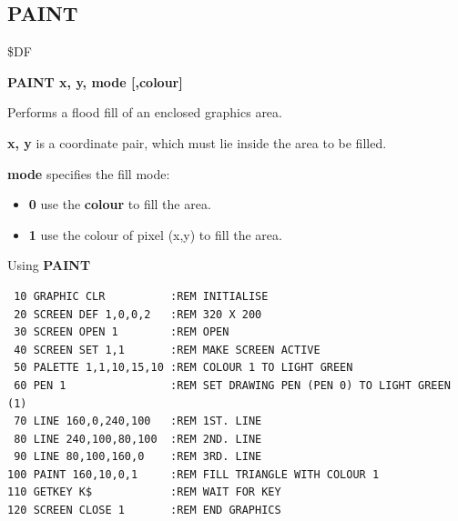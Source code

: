 
\newpage
\subsection{PAINT}
\begin{description}[leftmargin=2cm,style=nextline]
\item [Token:] \$DF
\item [Format:] {\bf PAINT x, y, mode [,colour]}
\item [Usage:]  Performs a flood fill
                of an enclosed graphics area.

                {\bf x, y} is a coordinate pair, which must
                lie inside the area to be filled.

                {\bf mode} specifies the fill mode:
                \begin{itemize}
                    \item {\bf 0} use the {\bf colour} to fill the area.
                    \item {\bf 1} use the colour of pixel (x,y) to fill the area.
                \end{itemize}


\item [Example:] Using {\bf PAINT}

\begin{tcolorbox}[colback=black,coltext=white]
\verbatimfont{\codefont}
\begin{verbatim}
 10 GRAPHIC CLR          :REM INITIALISE
 20 SCREEN DEF 1,0,0,2   :REM 320 X 200
 30 SCREEN OPEN 1        :REM OPEN
 40 SCREEN SET 1,1       :REM MAKE SCREEN ACTIVE
 50 PALETTE 1,1,10,15,10 :REM COLOUR 1 TO LIGHT GREEN
 60 PEN 1                :REM SET DRAWING PEN (PEN 0) TO LIGHT GREEN (1)
 70 LINE 160,0,240,100   :REM 1ST. LINE
 80 LINE 240,100,80,100  :REM 2ND. LINE
 90 LINE 80,100,160,0    :REM 3RD. LINE
100 PAINT 160,10,0,1     :REM FILL TRIANGLE WITH COLOUR 1
110 GETKEY K$            :REM WAIT FOR KEY
120 SCREEN CLOSE 1       :REM END GRAPHICS
\end{verbatim}
\end{tcolorbox}
\end{description}


\newpage
